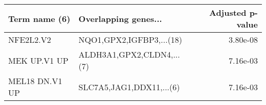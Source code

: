 \begin{tabular}{llr}
\toprule
 Term name (6) &      Overlapping genes... &  Adjusted p-value \\
\midrule
     NFE2L2.V2 &  NQO1,GPX2,IGFBP3,...(18) &          3.80e-08 \\
  MEK UP.V1 UP & ALDH3A1,GPX2,CLDN4,...(7) &          7.16e-03 \\
MEL18 DN.V1 UP &  SLC7A5,JAG1,DDX11,...(6) &          7.16e-03 \\
\bottomrule
\end{tabular}
